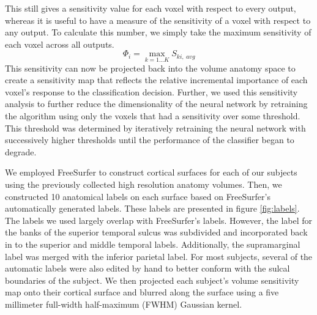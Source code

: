 \documentclass[preprint,5p,authoryear]{elsarticle}
\begin{document}
This still gives a sensitivity value for each voxel with respect to every output, whereas it is useful to have a measure of the sensitivity of a voxel with respect to any output.
To calculate this number, we simply take the maximum sensitivity of each voxel across all outputs.
\begin{equation}
\Phi_{i} = \max_{k=1 \dots K}{S_{ki,~avg}}
\end{equation}
This sensitivity can now be projected back into the volume anatomy space to create a sensitivity map that reflects the relative incremental importance of each voxel's response to the classification decision.
Further, we used this sensitivity analysis to further reduce the dimensionality of the neural network by retraining the algorithm using only the voxels that had a sensitivity over some threshold.
This threshold was determined by iteratively retraining the neural network with successively higher thresholds until the performance of the classifier began to degrade.

We employed FreeSurfer \citep{FreeSurfer} to construct cortical surfaces for each of our subjects using the previously collected high resolution anatomy volumes.
Then, we constructed 10 anatomical labels on each surface based on FreeSurfer's automatically generated labels.
These labels are presented in figure \ref{fig:labels}.
The labels we used largely overlap with FreeSurfer's labels.
However, the label for the banks of the superior temporal sulcus was subdivided and incorporated back in to the superior and middle temporal labels.
Additionally, the supramarginal label was merged with the inferior parietal label.
For most subjects, several of the automatic labels were also edited by hand to better conform with the sulcal boundaries of the subject.
We then projected each subject's volume sensitivity map onto their cortical surface and blurred along the surface using a five millimeter full-width half-maximum (FWHM) Gaussian kernel.
\end{document}
